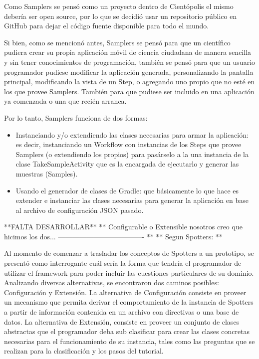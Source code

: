 Como Samplers se pensó como un proyecto dentro de Cientópolis\cite{cientopolis} el mismo debería ser open source, por lo que se decidió usar un repositorio público en GitHub\cite{github} para dejar el código fuente disponible para todo el mundo.

Si bien, como se mencionó antes, Samplers se pensó para que un científico pudiera crear su propia aplicación móvil de ciencia ciudadana de manera sencilla y sin tener conocimientos de programación, también se pensó para que un usuario programador pudiese modificar la aplicación generada, personalizando la pantalla principal, modificando la vista de un Step, o agregando uno propio que no esté en los que provee Samplers. También para que pudiese ser incluido en una aplicación ya comenzada o una que recién arranca.

Por lo tanto, Samplers funciona de dos formas:
\begin{itemize}
\item Instanciando y/o extendiendo las clases necesarias para armar la aplicación: es decir, instanciando un Workflow con instancias de los Steps que provee Samplers (o extendiendo los propios) para pasárselo a la una instancia de la clase TakeSampleActivity que es la encargada de ejecutarlo y generar las muestras (Samples).
\item Usando el generador de clases de Gradle: que básicamente lo que hace es extender e instanciar las clases necesarias para generar la aplicación en base al archivo de configuración JSON pasado. 
\end{itemize}



**FALTA DESARROLLAR**
** Configurable o Extensible nosotros creo que hicimos los dos... ------------------------------------- **
** Segun Spotters: **

Al momento de comenzar a trasladar los conceptos de Spotters a un prototipo, se presentó  como  interrogante  cuál  sería  la  forma  que  tendría  el  programador  de  utilizar el  framework  para  poder  incluir  las  cuestiones  particulares  de  su  dominio.  Analizando diversas alternativas, se encontraron dos caminos posibles: Configuración y Extensión. 
La  alternativa  de  Configuración  consiste  en  proveer  un  mecanismo  que  permita derivar el comportamiento de la instancia de Spotters a partir de información contenida en  un  archivo  con  directivas  o  una  base  de  datos.  La  alternativa  de Extensión,  consiste en  proveer  un  conjunto  de  clases  abstractas  que  el  programador  deba  sub  clasificar para crear las clases concretas necesarias para el funcionamiento de su instancia, tales como las preguntas que se realizan para la clasificación y los pasos del tutorial.

